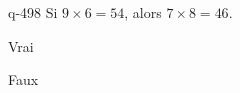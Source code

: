 \begin{truefalse}{q-498}
Si $9\times 6 = 54$, alors $7\times 8 = 46$.
\item Vrai
\item* Faux
\end{truefalse}

